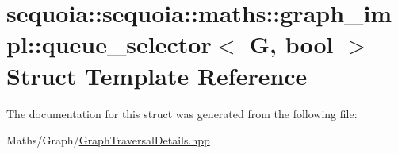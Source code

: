 \hypertarget{structsequoia_1_1sequoia_1_1maths_1_1graph__impl_1_1queue__selector}{}\section{sequoia\+::sequoia\+::maths\+::graph\+\_\+impl\+::queue\+\_\+selector$<$ G, bool $>$ Struct Template Reference}
\label{structsequoia_1_1sequoia_1_1maths_1_1graph__impl_1_1queue__selector}


The documentation for this struct was generated from the following file\+:\begin{DoxyCompactItemize}
\item 
Maths/\+Graph/\mbox{\hyperlink{_graph_traversal_details_8hpp}{Graph\+Traversal\+Details.\+hpp}}\end{DoxyCompactItemize}
